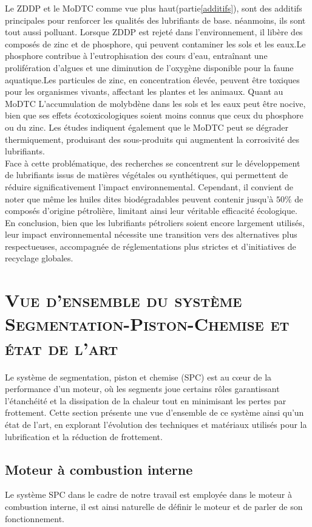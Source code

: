 Le ZDDP et le MoDTC comme vue plus haut(partie\ref{additifs}), sont des additifs principales pour renforcer les qualités des lubrifiants de base. néanmoins, ils sont tout aussi polluant. Lorsque ZDDP est rejeté dans l’environnement, il libère des composés de zinc et de phosphore, qui peuvent contaminer les sols et les eaux.Le phosphore contribue à l’eutrophisation des cours d’eau, entraînant une prolifération d’algues et une diminution de l’oxygène disponible pour la faune aquatique.Les particules de zinc, en concentration élevée, peuvent être toxiques pour les organismes vivants, affectant les plantes et les animaux.\cite{zddp} Quant au MoDTC L'accumulation de molybdène dans les sols et les eaux peut être nocive, bien que ses effets écotoxicologiques soient moins connus que ceux du phosphore ou du zinc. Les études indiquent également que le MoDTC peut se dégrader thermiquement, produisant des sous-produits qui augmentent la corrosivité des lubrifiants.\cite{zddp}\\
 
Face à cette problématique, des recherches se concentrent sur le développement de lubrifiants issus de matières végétales ou synthétiques, qui permettent de réduire significativement l’impact environnemental. Cependant, il convient de noter que même les huiles dites biodégradables peuvent contenir jusqu’à $50\%$ de composés d’origine pétrolière, limitant ainsi leur véritable efficacité écologique.\cite{enveroile}\\

En conclusion, bien que les lubrifiants pétroliers soient encore largement utilisés, leur impact environnemental nécessite une transition vers des alternatives plus respectueuses, accompagnée de réglementations plus strictes et d’initiatives de recyclage globales.
\section{\textsc{Vue d'ensemble du système Segmentation-Piston-Chemise et état de l'art} }\label{spc}
Le système de segmentation, piston et chemise (SPC) est au cœur de la performance d’un moteur, où les segments joue certains rôles garantissant l’étanchéité et la dissipation de la chaleur tout en minimisant les pertes par frottement. Cette section présente une vue d'ensemble de ce système ainsi qu’un état de l’art, en explorant l’évolution des techniques et matériaux utilisés pour la lubrification et la réduction de frottement.
\subsection{Moteur à combustion interne}
Le système SPC dans le cadre de notre travail est employée dans le moteur à combustion interne, il est ainsi naturelle de définir le moteur et de parler de son fonctionnement.\\


